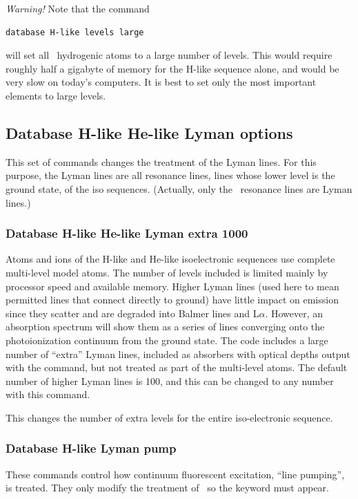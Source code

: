 \emph{Warning!}  Note that the command
\begin{verbatim}
database H-like levels large
\end{verbatim}
will set all \LIMELM\ hydrogenic atoms to a large number of levels.
This would
require roughly half a gigabyte of memory for the H-like sequence alone,
and would be very slow on today's computers.
It is best to set only the
most important elements to large levels.

\subsection{Database H-like \OR{} He-like Lyman options}

This set of commands changes the treatment of the Lyman lines.
For this purpose, the Lyman lines are all resonance lines,
lines whose lower level is the ground state,  of the  iso sequences.
(Actually, only the \hi\ resonance lines are Lyman lines.)

\subsubsection{Database H-like \OR{} He-like Lyman extra 1000}  

Atoms and ions of the H-like and He-like
isoelectronic sequences use complete multi-level model atoms.
The number of levels included is limited mainly by processor speed and
available memory.
Higher Lyman lines (used here to mean permitted lines that connect directly
to ground) have little impact on emission since they
scatter and are degraded
into Balmer lines and L$\alpha $.
However, an absorption spectrum will show them
as a series of lines converging onto the photoionization continuum from
the ground state.
The code includes a large number of ``extra'' Lyman lines,
included as absorbers with optical depths output with
the  command,
but not treated as part of the multi-level atoms.
The default number of higher Lyman lines is 100, and
this can be changed to any number with this command.

This changes the number of extra levels for the entire iso-electronic sequence.

\subsubsection{Database H-like Lyman pump}  

These commands control how continuum fluorescent excitation, ``line pumping'', is treated.
They only modify the treatment of \hi\ so the  keyword must appear.

